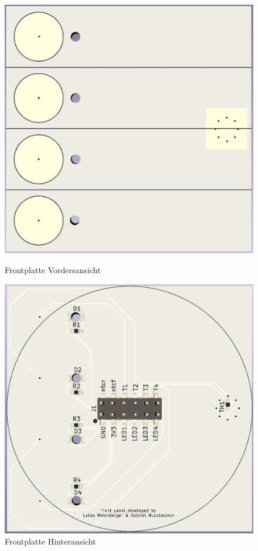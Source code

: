 \begin{figure}[h!]
	\centering
	\begin{minipage}[t]{0.4\linewidth}
	\centering
	\includegraphics[width=1\textwidth]{graphics/Frontplatte_vorne.jpg}
	\caption{Frontplatte Vordersansicht}
	\label{pic: Frontplatte_vorne}
	\end{minipage}%
	\hfill
	\begin{minipage}[t]{0.4\linewidth}
	\centering
	\includegraphics[width=1\textwidth]{graphics/Frontplatte_hinten.jpg}
	\caption{Frontplatte Hinteransicht}
	\label{pic: Frontplatte_hinten}
	\end{minipage}
\end{figure}

